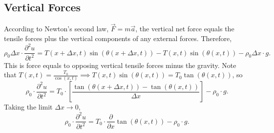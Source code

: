\documentclass[class=article,crop=false]{standalone}
\begin{document}
\subsection{Vertical Forces}
According to Newton's second law, $ \vec{ F}= m \vec{ a}  $, the vertical net force equals the tensile forces plus the vertical components of any external forces. Therefore,
\[
	\rho_0 \Delta x \cdot  \frac{\partial^2 u}{\partial { t}^2} = T(x+ \Delta x,t) \sin(\theta (x+ \Delta x, t) ) - T(x,t) \sin(\theta(x,t) ) - \rho_0 \Delta x \cdot  g
.\] 
This is force equals to opposing vertical tensile forces minus the gravity.
Note that $ T(x,t)=\frac{T_0}{\cos(x,t )} \implies T(x,t) \sin(\theta(x,t) ) = T_0 \tan(\theta(x,t)) $, so
\[
	\rho_0 \cdot \frac{\partial^2 u}{\partial { t}^2} = T_0 \cdot  \left[ \frac{\tan(\theta(x+ \Delta x, t))- \tan(\theta(x,t))}{\Delta x } \right] -\rho_0 \cdot  g
.\] 
Taking the limit $ \Delta x \to 0$,
\[
	\rho_0 \cdot  \frac{\partial^2 u}{\partial { t}^2} = T_0 \cdot  \frac{\partial }{\partial x} \tan(\theta(x,t)) - \rho_0 \cdot g
.\] 
\end{document}
